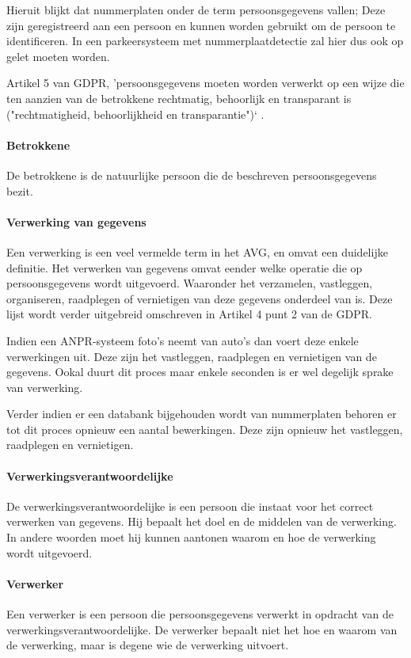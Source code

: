 Hieruit blijkt dat nummerplaten onder de term persoonsgegevens vallen; Deze zijn geregistreerd aan een persoon en kunnen worden gebruikt om de persoon te identificeren. In een parkeersysteem met nummerplaatdetectie zal hier dus ook op gelet moeten worden. 

Artikel 5 van GDPR, 'persoonsgegevens moeten worden verwerkt op een wijze die ten aanzien van de betrokkene rechtmatig, behoorlijk en transparant is ("rechtmatigheid, behoorlijkheid en transparantie")` \autocite{avg2018privacy}.

\paragraph{Betrokkene}
De betrokkene is de natuurlijke persoon die de beschreven persoonsgegevens bezit.

\paragraph{Verwerking van gegevens}
Een verwerking is een veel vermelde term in het AVG, en omvat een duidelijke definitie. Het verwerken van gegevens omvat eender welke operatie die op persoonsgegevens wordt uitgevoerd. Waaronder het verzamelen, vastleggen, organiseren, raadplegen of vernietigen van deze gegevens onderdeel van is. Deze lijst wordt verder uitgebreid omschreven in Artikel 4 punt 2 van de GDPR.

Indien een ANPR-systeem foto's neemt van auto's dan voert deze enkele verwerkingen uit. Deze zijn het vastleggen, raadplegen en vernietigen van de gegevens. Ookal duurt dit proces maar enkele seconden is er wel degelijk sprake van verwerking.

Verder indien er een databank bijgehouden wordt van nummerplaten behoren er tot dit proces opnieuw een aantal bewerkingen. Deze zijn opnieuw het vastleggen, raadplegen en vernietigen.

\paragraph{Verwerkingsverantwoordelijke}
De verwerkingsverantwoordelijke is een persoon die instaat voor het correct verwerken van gegevens. Hij bepaalt het doel en de middelen van de verwerking. In andere woorden moet hij kunnen aantonen waarom en hoe de verwerking wordt uitgevoerd.

\paragraph{Verwerker}
Een verwerker is een persoon die persoonsgegevens verwerkt in opdracht van de verwerkingsverantwoordelijke. De verwerker bepaalt niet het hoe en waarom van de verwerking, maar is degene wie de verwerking uitvoert.

